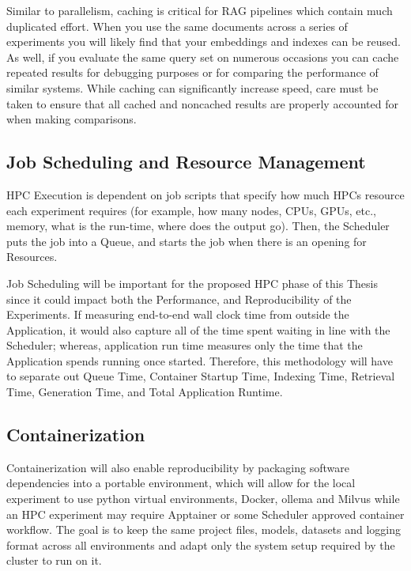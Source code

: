 Similar to parallelism, caching is critical for \ac{RAG} pipelines which contain much duplicated effort. When you use the same documents across a series of experiments you will likely find that your embeddings and indexes can be reused. As well, if you evaluate the same query set on numerous occasions you can cache repeated results for debugging purposes or for comparing the performance of similar systems. While caching can significantly increase speed, care must be taken to ensure that all cached and noncached results are properly accounted for when making comparisons.

\subsection{Job Scheduling and Resource Management}

\ac{HPC} Execution is dependent on job scripts that specify how much \acp{HPC} resource each experiment requires (for example, how many nodes, \acp{CPU}, \acp{GPU}, etc., memory, what is the run-time, where does the output go). Then, the Scheduler puts the job into a Queue, and starts the job when there is an opening for Resources.

Job Scheduling will be important for the proposed \ac{HPC} phase of this Thesis since it could impact both the Performance, and Reproducibility of the Experiments. If measuring end-to-end wall clock time from outside the Application, it would also capture all of the time spent waiting in line with the Scheduler; whereas, application run time measures only the time that the Application spends running once started. Therefore, this methodology will have to separate out Queue Time, Container Startup Time, Indexing Time, Retrieval Time, Generation Time, and Total Application Runtime.

\subsection{Containerization}

Containerization will also enable reproducibility by packaging software dependencies into a portable environment, which will allow for the local experiment to use python virtual environments, Docker, ollema and Milvus while an \ac{HPC} experiment may require Apptainer or some Scheduler approved container workflow. The goal is to keep the same project files, models, datasets and logging format across all environments and adapt only the system setup required by the cluster to run on it.

